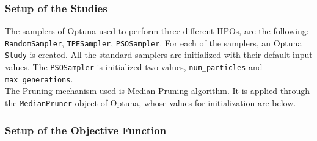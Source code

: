 \subsubsection{Setup of the Studies}

The samplers of Optuna used to perform three different HPOs, are the following: \texttt{RandomSampler}, \texttt{TPESampler}, \texttt{PSOSampler}.
For each of the samplers, an Optuna \texttt{Study} is created. All the standard samplers are initialized with their default input values. The \texttt{PSOSampler} is initialized two values, \texttt{num\_particles} and \texttt{max\_generations}.
\\[0.3cm]The Pruning mechanism used is Median Pruning algorithm. It is applied through the \texttt{MedianPruner} object of Optuna, whose values for initialization are below.

\subsubsection{Setup of the Objective Function}

